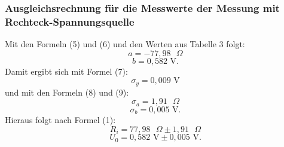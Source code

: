 \subsubsection{Ausgleichsrechnung für die Messwerte der Messung mit Rechteck-Spannungsquelle}
Mit den Formeln (5) und (6) und den Werten aus Tabelle 3 folgt:
\begin{displaymath}
a=-77,98\text{ }\Omega
\end{displaymath}
\begin{displaymath}
b=0,582\text{ V.}
\end{displaymath}
Damit ergibt sich mit Formel (7):
\begin{displaymath}
\sigma_y=0,009\text{ V}
\end{displaymath}
und mit den Formeln (8) und (9):
\begin{displaymath}
\sigma_a=1,91\text{ }\Omega
\end{displaymath}
\begin{displaymath}
\sigma_b=0,005\text{ V.}
\end{displaymath}
Hieraus folgt nach Formel (1):
\begin{displaymath}
R_i=77,98\text{ }\Omega\pm 1,91\text{ }\Omega
\end{displaymath}
\begin{displaymath}
U_0=0,582\text{ V}\pm 0,005\text{ V.}
\end{displaymath}

